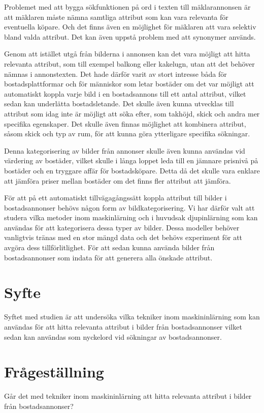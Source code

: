 \documentclass[]{kththesis}
\begin{document}
Problemet med att bygga sökfunktionen på ord i texten till mäklarannonsen är att mäklaren måste nämna samtliga attribut som kan vara relevanta för eventuella köpare. Och det finns även en möjlighet för mäklaren att vara selektiv bland valda attribut. Det kan även uppstå problem med att synonymer används.

Genom att istället utgå från bilderna i annonsen kan det vara möjligt att hitta relevanta attribut, som till exempel balkong eller kakelugn, utan att det behöver nämnas i annonstexten. Det hade därför varit av stort intresse båda för bostadsplattformar och för människor som letar bostäder om det var möjligt att automatiskt koppla varje bild i en bostadsannons till ett antal attribut, vilket sedan kan underlätta bostadsletande. Det skulle även kunna utvecklas till attribut som idag inte är möjligt att söka efter, som takhöjd, skick och andra mer specifika egenskaper. Det skulle även finnas möjlighet att kombinera attribut, såsom skick och typ av rum, för att kunna göra ytterligare specifika sökningar.

Denna kategorisering av bilder från annonser skulle även kunna användas vid värdering av bostäder, vilket skulle i långa loppet leda till en jämnare prisnivå på bostäder och en tryggare affär för bostadsköpare. Detta då det skulle vara enklare att jämföra priser mellan bostäder om det finns fler attribut att jämföra.

För att på ett automatiskt tillvägagångssätt koppla attribut till bilder i bostadsannonser behövs någon form av bildkategorisering. Vi har därför valt att studera vilka metoder inom maskinlärning och i huvudsak djupinlärning som kan användas för att kategorisera dessa typer av bilder. Dessa modeller behöver vanligtvis tränas med en stor mängd data och det behövs experiment för att avgöra dess tillförlitlighet. För att sedan kunna använda bilder från bostadsannonser som indata för att generera alla önskade attribut.

\section{Syfte}
Syftet med studien är att undersöka vilka tekniker inom maskininlärning som kan användas för att hitta relevanta attribut i bilder från bostadsannonser vilket sedan kan användas som nyckelord vid sökningar av bostadsannonser.

\section{Frågeställning}
Går det med tekniker inom maskininlärning att hitta relevanta attribut i bilder från bostadsannonser?
\end{document}
